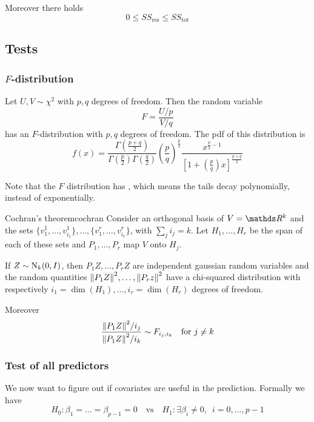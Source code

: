 \documentclass[12pt]{extarticle}
\newcommand{\Normal}{{\operatorfont N}}
\begin{document}
Moreover there holds
\begin{equation}
	0 \leq SS_\text{res} \leq SS_\text{tot}
\end{equation}

\subsection{Tests}

\subsubsection{\texorpdfstring{$F$}{F}-distribution}
Let $U, V \sim \chi^2$ with $p, q$ degrees of freedom.
Then the random variable
\begin{equation}
	F = \frac{U/p}{V/q}
\end{equation}
has an $F$-distribution with $p,q$ degrees of freedom.
The pdf of this distribution is
\begin{equation}
	f(x) =
	\frac{\Gamma\left( \frac{p+q}{2} \right)}{\Gamma\left(\frac{p}{2}\right) \Gamma\left(\frac{q}{2}\right)}
	\left( \frac{p}{q} \right)^{\frac{p}{2}}
	\frac{x^{\frac{p}{2}-1}}{\left[1+\left( \frac{p}{q} \right) x \right]^{\frac{p+q}{2}}}
\end{equation}

Note that the $F$ distribution has , which means the tails decay polynomially, instead of exponentially.

\begin{theorem}{Cochran's theorem}{cochran}
	Consider an orthogonal basis of $V = \R^k$ and the sets $\{v_1^1, \dots, v_{i_1}^1\},\dots,\{v_1^r, \dots, v_{i_r}^r\}$,
	with $\sum_j i_j = k$.
	Let $H_1, \dots, H_r$ be the span of each of these sets
	and $P_1, \dots, P_r$ map $V$ onto $H_j$.

	If $Z \sim \Normal_k(0, I)$, then $P_1 Z, \dots, P_r Z$ are independent gaussian random variables
	and the random quantities $\norm{P_1 Z}^2, \dots, \norm{P_r z}^2$ have a chi-squared distribution
	with respectively $i_1 = \dim(H_1), \dots, i_r = \dim(H_r)$ degrees of freedom.

	Moreover
	\begin{equation}
		\frac{\norm{P_1 Z}^2/i_j}{\norm{P_1 Z}^2/i_k} \sim F_{i_j, i_k} \quad \text{for } j \neq k
	\end{equation}
\end{theorem}

\subsubsection{Test of all predictors}
We now want to figure out if covariates are useful in the prediction.
Formally we have
\begin{equation}
	H_0: \beta_1 = \dots = \beta_{p-1} = 0 \quad \text{vs} \quad H_1: \exists \beta_i \neq 0, \enspace i = 0, \dots, p-1
\end{equation}
\end{document}
